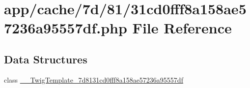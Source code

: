 \hypertarget{31cd0fff8a158ae57236a95557df_8php}{\section{app/cache/7d/81/31cd0fff8a158ae57236a95557df.php File Reference}
\label{31cd0fff8a158ae57236a95557df_8php}
}
\subsection*{Data Structures}
\begin{DoxyCompactItemize}
\item 
class \hyperlink{class_____twig_template__7d8131cd0fff8a158ae57236a95557df}{\-\_\-\-\_\-\-Twig\-Template\-\_\-7d8131cd0fff8a158ae57236a95557df}
\end{DoxyCompactItemize}
